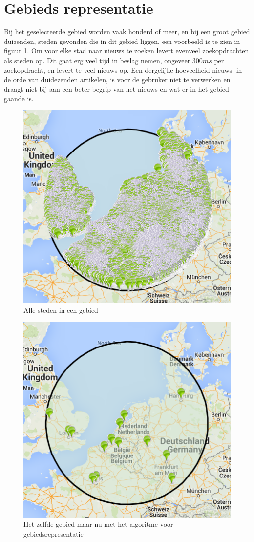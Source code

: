 \documentclass[twoside,openright]{uva-bachelor-thesis}
\begin{document}
	\section{Gebieds representatie}
		Bij het geselecteerde gebied worden vaak honderd of meer, en bij een groot gebied duizenden, steden gevonden die in dit gebied liggen, een voorbeeld is te zien in figuur \ref{fig:without}. Om voor elke stad naar nieuws te zoeken levert evenveel zoekopdrachten als steden op. Dit gaat erg veel tijd in beslag nemen, ongeveer $300ms$ per zoekopdracht, en levert te veel nieuws op. Een dergelijke hoeveelheid nieuws, in de orde van duidezenden artikelen, is voor de gebruker niet te verwerken en draagt niet bij aan een beter begrip van het nieuws en wat er in het gebied gaande is.
		\begin{figure}[!htb]
			\centering
			\includegraphics[scale=1.0]{./img/area_wo_algo.png}
			\caption{Alle steden in een gebied}
			\label{fig:without}
		\end{figure}
		\begin{figure}[!htb]
			\centering
			\includegraphics[scale=1.0]{./img/area_w_algo.png}
			\caption{Het zelfde gebied maar nu met het algoritme voor gebiedsrepresentatie}
			\label{fig:with}
		\end{figure}
\end{document}
